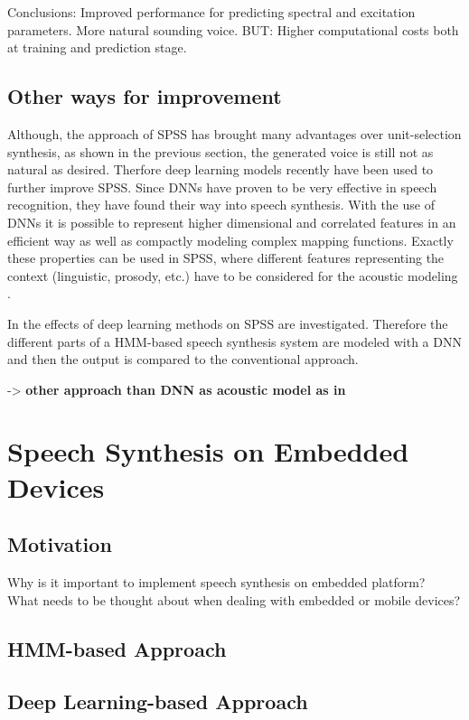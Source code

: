 Conclusions: Improved performance for predicting spectral and excitation parameters. More natural sounding voice. BUT: Higher computational costs both at training and prediction stage.

\vspace{2em}

\subsection{Other ways for improvement}
\label{subsec:deepeffect}

Although, the approach of \ac{SPSS} has brought many advantages over unit-selection synthesis, as shown in the previous section, the generated voice is still not as natural as desired. Therfore deep learning models recently have been used to further improve \ac{SPSS}. Since \acp{DNN} have proven to be very effective in speech recognition, they have found their way into speech synthesis. With the use of \acp{DNN} it is possible to represent higher dimensional and correlated features in an efficient way as well as compactly modeling complex mapping functions. Exactly these properties can be used in \ac{SPSS}, where different features representing the context (linguistic, prosody, etc.) have to be considered for the acoustic modeling \cite{hashimoto:effect}.

In \cite{hashimoto:effect} the effects of deep learning methods on \ac{SPSS} are investigated. Therefore the different parts of a \ac{HMM}-based speech synthesis system are modeled with a \ac{DNN} and then the output is compared to the conventional approach.

-> \textbf{other approach than DNN as acoustic model as in \cite{zen:deepstatistical}}

\newpage


\section{Speech Synthesis on Embedded Devices}
\label{sec:embeddedspeech}

\subsection{Motivation}
\label{subsec:motembedded}

Why is it important to implement speech synthesis on embedded platform?\\
What needs to be thought about when dealing with embedded or mobile devices?

\subsection{\ac{HMM}-based Approach}
\label{subsec:hmmembedded}

\subsection{Deep Learning-based Approach}
\label{subsec:deepembedded}

\clearpage

